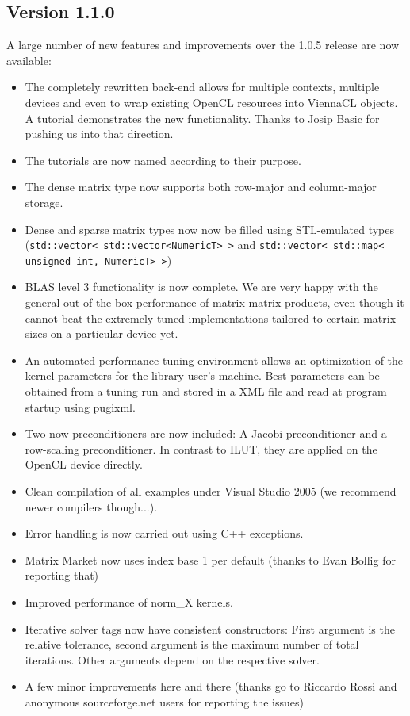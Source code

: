 \subsection*{Version 1.1.0}
A large number of new features and improvements over the 1.0.5 release are now available:
\begin{itemize}
 \item The completely rewritten {\OpenCL} back-end allows for multiple contexts, multiple devices and even to wrap existing OpenCL resources into ViennaCL objects. A tutorial demonstrates the new functionality. Thanks to Josip Basic for pushing us into that direction.
 \item The tutorials are now named according to their purpose.
 \item The dense matrix type now supports both row-major and column-major
storage.
 \item Dense and sparse matrix types now now be filled using STL-emulated types (\lstinline|std::vector< std::vector<NumericT> >| and \lstinline|std::vector< std::map< unsigned int, NumericT> >|)
 \item BLAS level 3 functionality is now complete. We are very happy with the general out-of-the-box performance of matrix-matrix-products, even though it cannot beat the extremely tuned implementations tailored to certain matrix sizes on a particular device yet.
 \item An automated performance tuning environment allows an optimization of the kernel parameters for the library user's machine. Best parameters can be obtained from a tuning run and stored in a XML file and read at program startup using pugixml.
 \item Two now preconditioners are now included: A Jacobi preconditioner and a row-scaling preconditioner. In contrast to ILUT, they are applied on the OpenCL device directly.
 \item Clean compilation of all examples under Visual Studio 2005 (we recommend newer compilers though...).
 \item Error handling is now carried out using C++ exceptions.
 \item Matrix Market now uses index base 1 per default (thanks to Evan Bollig for reporting that)
 \item Improved performance of norm\_X kernels.
 \item Iterative solver tags now have consistent constructors: First argument is the relative tolerance, second argument is the maximum number of total iterations. Other arguments depend on the respective solver.
 \item A few minor improvements here and there (thanks go to Riccardo Rossi and anonymous sourceforge.net users for reporting the issues)
\end{itemize}

